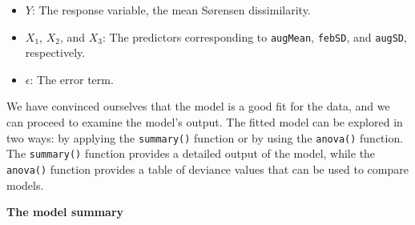 \documentclass[
  letterpaper,
]{book}
\providecommand{\tightlist}{%
  \setlength{\itemsep}{0pt}\setlength{\parskip}{0pt}}\usepackage{longtable,booktabs,array}
\begin{document}
\begin{itemize}
\tightlist
\item
  \(Y\): The response variable, the mean Sørensen dissimilarity.
\item
  \(X_1\), \(X_2\), and \(X_3\): The predictors corresponding to
  \texttt{augMean}, \texttt{febSD}, and \texttt{augSD}, respectively.
\item
  \(\epsilon\): The error term.
\end{itemize}

We have convinced ourselves that the model is a good fit for the data,
and we can proceed to examine the model's output. The fitted model can
be explored in two ways: by applying the \texttt{summary()} function or
by using the \texttt{anova()} function. The \texttt{summary()} function
provides a detailed output of the model, while the \texttt{anova()}
function provides a table of deviance values that can be used to compare
models.

\textbf{The model summary}
\end{document}
